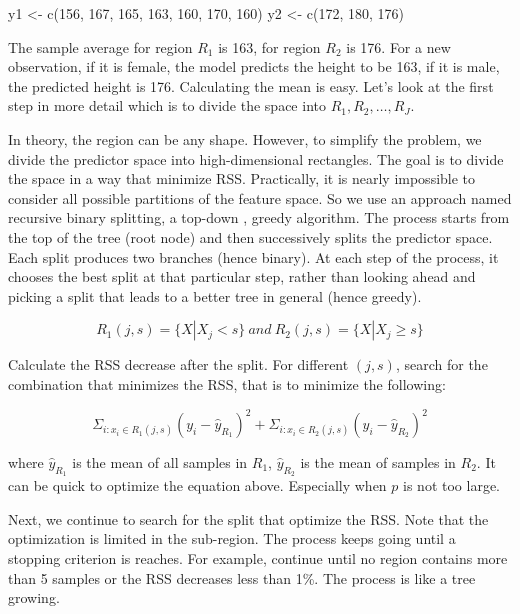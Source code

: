 \documentclass[
  12pt,
]{krantz}
\makeatletter
\newenvironment{Shaded}{\begin{snugshade}}{\end{snugshade}}
\newcommand{\DecValTok}[1]{\textcolor[rgb]{0.06,0.06,0.06}{#1}}
\newcommand{\FunctionTok}[1]{\textcolor[rgb]{0,0,0}{#1}}
\newcommand{\NormalTok}[1]{#1}
\newcommand{\OtherTok}[1]{\textcolor[rgb]{0.37,0.37,0.37}{#1}}
\newenvironment{kframe}{%
\medskip{}
\setlength{\fboxsep}{.8em}
 \def\at@end@of@kframe{}%
 \ifinner\ifhmode%
  \def\at@end@of@kframe{\end{minipage}}%
  \begin{minipage}{\columnwidth}%
 \fi\fi%
 \def\FrameCommand##1{\hskip\@totalleftmargin \hskip-\fboxsep
 \colorbox{shadecolor}{##1}\hskip-\fboxsep
     \hskip-\linewidth \hskip-\@totalleftmargin \hskip\columnwidth}%
 \MakeFramed {\advance\hsize-\width
   \@totalleftmargin\z@ \linewidth\hsize
   \@setminipage}}%
 {\par\unskip\endMakeFramed%
 \at@end@of@kframe}
\renewenvironment{Shaded}{\begin{kframe}}{\end{kframe}}
\makeatother
\begin{document}
\begin{Shaded}
\begin{Highlighting}[]
\NormalTok{y1 }\OtherTok{\textless{}{-}} \FunctionTok{c}\NormalTok{(}\DecValTok{156}\NormalTok{, }\DecValTok{167}\NormalTok{, }\DecValTok{165}\NormalTok{, }\DecValTok{163}\NormalTok{, }\DecValTok{160}\NormalTok{, }\DecValTok{170}\NormalTok{, }\DecValTok{160}\NormalTok{)}
\NormalTok{y2 }\OtherTok{\textless{}{-}} \FunctionTok{c}\NormalTok{(}\DecValTok{172}\NormalTok{, }\DecValTok{180}\NormalTok{, }\DecValTok{176}\NormalTok{)}
\end{Highlighting}
\end{Shaded}

The sample average for region \(R_1\) is 163, for region \(R_2\) is 176. For a new observation, if it is female, the model predicts the height to be 163, if it is male, the predicted height is 176. Calculating the mean is easy. Let's look at the first step in more detail which is to divide the space into \(R_1, R_2, \dots, R_J\).

In theory, the region can be any shape. However, to simplify the problem, we divide the predictor space into high-dimensional rectangles. The goal is to divide the space in a way that minimize RSS. Practically, it is nearly impossible to consider all possible partitions of the feature space. So we use an approach named recursive binary splitting, a top-down , greedy algorithm. The process starts from the top of the tree (root node) and then successively splits the predictor space. Each split produces two branches (hence binary). At each step of the process, it chooses the best split at that particular step, rather than looking ahead and picking a split that leads to a better tree in general (hence greedy).

\[R_{1}(j, s)=\{X|X_j<s\}\ and\ R_{2}(j, s)=\{X|X_j\geq s\}\]

Calculate the RSS decrease after the split. For different \((j,s)\), search for the combination that minimizes the RSS, that is to minimize the following:

\[\Sigma_{i:x_i\in R_1(j,s)}(y_i-\hat{y}_{R_{1}})^2+\Sigma_{i:x_i\in R_2(j,s)}(y_i-\hat{y}_{R_{2}})^2\]

where \(\hat{y}_{R_1}\) is the mean of all samples in \(R_1\), \(\hat{y}_{R_2}\) is the mean of samples in \(R_2\). It can be quick to optimize the equation above. Especially when \(p\) is not too large.

Next, we continue to search for the split that optimize the RSS. Note that the optimization is limited in the sub-region. The process keeps going until a stopping criterion is reaches. For example, continue until no region contains more than 5 samples or the RSS decreases less than 1\%. The process is like a tree growing.
\end{document}
